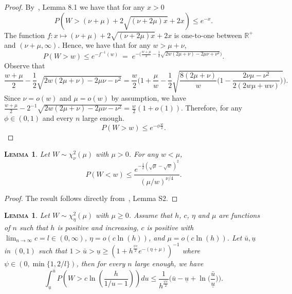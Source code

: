 \documentclass[
  12pt]{article}
\newcommand{\R}{\mathbb{R}}
\newtheorem{lem}[thm]{\textsc{Lemma}}
\begin{document}
\begin{proof}
By~\cite{birge}, Lemma 8.1 we have that for any $x>0$
$$P(W> (\nu+\mu)+2 \sqrt{(\nu+2 \mu) x}+2 x) \leq e^{-x}.$$
The function $f:x\mapsto (\nu+\mu)+2 \sqrt{(\nu+2 \mu) x}+2 x$ is  one-to-one between $\R^+$ and $( \nu+
\mu,\infty)$. 
Hence, we have that for any $w>\mu+\nu$,
$$P(W > w) \leq e^{-f^{-1}(w)} \:=\; e^{-\big(\frac{w+\mu}{2}  - \frac{1}{2}\sqrt{2w(2 \mu+\nu)-2 \mu \nu + \nu^2 }\big) } .$$
Observe that
$$\frac{w+\mu}{2}  - \frac{1}{2}\sqrt{2w( 2 \mu+ \nu)-2 \mu \nu - \nu^2 }= \frac{w}{2}\bigg(1+\frac{\mu}{w} -\frac{1}{2}\sqrt{\frac{8(2 \mu+\nu)}{w}\bigg(1-\frac{2\nu\mu-\nu^2}{2(2w\mu+w\nu)} \bigg)}\bigg).$$
 Since $\nu=o(w)$ and $\mu=o(w)$ by assumption, we have $\frac{w+\mu}{2}  - {2}^{-1}\sqrt{2w( 2 \mu+ \nu)-2 \mu \nu - \nu^2 }= \frac{w}{2}(1+o(1))$. Therefore, for any $\phi\in(0,1)$ and every $n$ large enough.
$$P(W > w) \leq  e^{-\phi\frac{w}{2}}.$$
\end{proof}


\begin{lem}\label{lemma:s2} Let $W \sim \chi_\nu^2(\mu)$ with $\mu>0$. For any $w<\mu$, 
$$
P(W<w) \leq \frac{e^{-\frac{1}{2}(\sqrt{\mu}-\sqrt{w})^2}}{(\mu / w)^{\nu / 4}}.$$
\end{lem}

\begin{proof}
The result follows directly from~\cite{rossell2022concentration}, Lemma S2.
\end{proof}

\begin{lem}\label{lemma:s18} 
    Let $W\sim \chi_\eta^2(\mu)$ with $\mu \geq 0$. Assume that $h$, $c$, $\eta$ and $\mu$ are functions of $n$ such that $h$ is positive and increasing, $c$ is positive with $\lim_{n\to\infty}c=l \in(0,\infty)$, $\eta=o(c\ln(h))$, and $\mu=o(c\ln(h))$. Let $\bar{u},\underline{u}$ in $(0,1)$ such that $1>\bar{u}>\underline{u}\geq\left(1+h^{\frac{\psi c}{2}}e^{-(\eta+\mu)}\right)^{-1}$ where $\psi\in(0,\min\{1,2/l\})$, then for every $n$ large enough, we have 
$$
\int_{\underline{u}}^{\bar{u}} P\left(W>c\ln \left(\frac{h}{1 / u-1}\right)\right) d u \leq  \frac{1}{h^{\frac{\psi c}{2}}}\Big(\bar{u}-\underline{u}+\ln\Big(\frac{\bar{u}}{\underline{u}}\Big)\Big).
$$
\end{lem}
\end{document}
